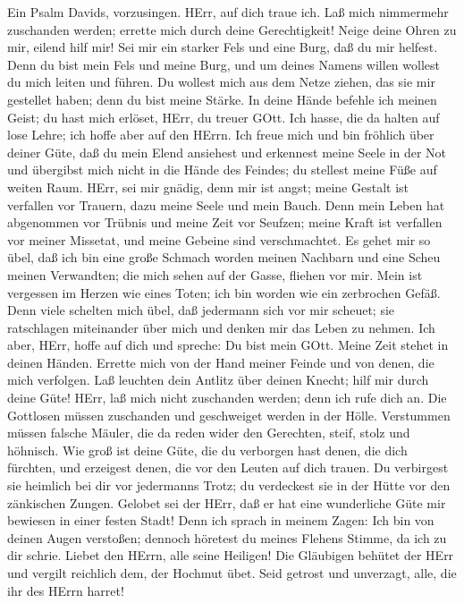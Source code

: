  Ein Psalm Davids, vorzusingen.  HErr, auf dich
traue ich. Laß mich nimmermehr zuschanden werden; errette mich durch
deine Gerechtigkeit!  Neige deine Ohren zu mir, eilend hilf
mir! Sei mir ein starker Fels und eine Burg, daß du mir helfest.
 Denn du bist mein Fels und meine Burg, und um deines Namens
willen wollest du mich leiten und führen.  Du wollest mich
aus dem Netze ziehen, das sie mir gestellet haben; denn du bist meine
Stärke.  In deine Hände befehle ich meinen Geist; du hast
mich erlöset, HErr, du treuer GOtt.  Ich hasse, die da
halten auf lose Lehre; ich hoffe aber auf den HErrn.  Ich
freue mich und bin fröhlich über deiner Güte, daß du mein Elend
ansiehest und erkennest meine Seele in der Not  und
übergibst mich nicht in die Hände des Feindes; du stellest meine Füße
auf weiten Raum.  HErr, sei mir gnädig, denn mir ist angst;
meine Gestalt ist verfallen vor Trauern, dazu meine Seele und mein
Bauch.  Denn mein Leben hat abgenommen vor Trübnis und
meine Zeit vor Seufzen; meine Kraft ist verfallen vor meiner Missetat,
und meine Gebeine sind verschmachtet.  Es gehet mir so
übel, daß ich bin eine große Schmach worden meinen Nachbarn und eine
Scheu meinen Verwandten; die mich sehen auf der Gasse, fliehen vor mir.
 Mein ist vergessen im Herzen wie eines Toten; ich bin
worden wie ein zerbrochen Gefäß.  Denn viele schelten mich
übel, daß jedermann sich vor mir scheuet; sie ratschlagen miteinander
über mich und denken mir das Leben zu nehmen.  Ich aber,
HErr, hoffe auf dich und spreche: Du bist mein GOtt.  Meine
Zeit stehet in deinen Händen. Errette mich von der Hand meiner Feinde
und von denen, die mich verfolgen.  Laß leuchten dein
Antlitz über deinen Knecht; hilf mir durch deine Güte! 
HErr, laß mich nicht zuschanden werden; denn ich rufe dich an. Die
Gottlosen müssen zuschanden und geschweiget werden in der Hölle.
 Verstummen müssen falsche Mäuler, die da reden wider den
Gerechten, steif, stolz und höhnisch.  Wie groß ist deine
Güte, die du verborgen hast denen, die dich fürchten, und erzeigest
denen, die vor den Leuten auf dich trauen.  Du verbirgest
sie heimlich bei dir vor jedermanns Trotz; du verdeckest sie in der
Hütte vor den zänkischen Zungen.  Gelobet sei der HErr, daß
er hat eine wunderliche Güte mir bewiesen in einer festen Stadt!
 Denn ich sprach in meinem Zagen: Ich bin von deinen Augen
verstoßen; dennoch höretest du meines Flehens Stimme, da ich zu dir
schrie.  Liebet den HErrn, alle seine Heiligen! Die
Gläubigen behütet der HErr und vergilt reichlich dem, der Hochmut übet.
 Seid getrost und unverzagt, alle, die ihr des HErrn
harret!

